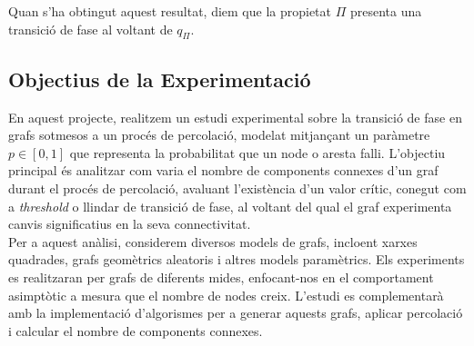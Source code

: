 \documentclass[a4paper]{article}
\begin{document}
	Quan s'ha obtingut aquest resultat, diem que la propietat $\Pi$ presenta una transició de fase al voltant de $q_{\Pi}$. \\
	
	\subsection{Objectius de la Experimentació}
	
	En aquest projecte, realitzem un estudi experimental sobre la transició de fase en grafs sotmesos a un procés de percolació, modelat mitjançant un paràmetre $p \in [0, 1]$ que representa la probabilitat que un node o aresta falli. L'objectiu principal és analitzar com varia el nombre de components connexes d'un graf durant el procés de percolació, avaluant l'existència d'un valor crític, conegut com a \textit{threshold} o llindar de transició de fase, al voltant del qual el graf experimenta canvis significatius en la seva connectivitat. \\
	
	Per a aquest anàlisi, considerem diversos models de grafs, incloent xarxes quadrades, grafs geomètrics aleatoris i altres models paramètrics. Els experiments es realitzaran per grafs de diferents mides, enfocant-nos en el comportament asimptòtic a mesura que el nombre de nodes creix. L'estudi es complementarà amb la implementació d'algorismes per a generar aquests grafs, aplicar percolació i calcular el nombre de components connexes. \\
	
\end{document}
